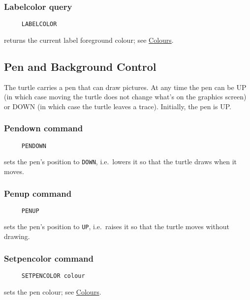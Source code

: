 \subsubsection*{Labelcolor query}
\begin{verbatim}
     LABELCOLOR
\end{verbatim}
returns the current label foreground colour; see
\hyperref[logoturtle:Colours]{Colours}.


\subsection{Pen and Background Control}
\label{logoturtle:PBC}

The turtle carries a pen that can draw pictures.  At any time the pen
can be UP (in which case moving the turtle does not change what's on the
graphics screen) or DOWN (in which case the turtle leaves a trace).
Initially, the pen is UP.

\subsubsection*{Pendown command}
\begin{verbatim}
     PENDOWN
\end{verbatim}
sets the pen's position to \texttt{DOWN}, i.e.\ lowers it so that the
turtle draws when it moves.

\subsubsection*{Penup command}
\begin{verbatim}
     PENUP
\end{verbatim}
sets the pen's position to \texttt{UP}, i.e.\ raises it so that the
turtle moves without drawing.

\subsubsection*{Setpencolor command}
\begin{verbatim}
     SETPENCOLOR colour
\end{verbatim}
\label{logoturtle:setpencolor}
sets the pen colour; see \hyperref[logoturtle:Colours]{Colours}.

